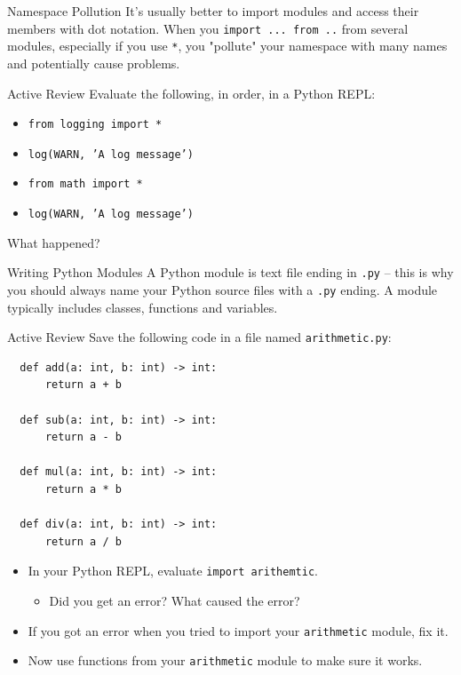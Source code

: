 \documentclass[smaller, aspectratio=1610]{beamer}
\begin{document}
\begin{frame}[label={sec:orgd4aeca5},fragile]{Namespace Pollution}
 It's usually better to import modules and access their members with dot notation.  When you \texttt{import ... from ..} from several modules, especially if you use \texttt{*}, you "pollute" your namespace with many names and potentially cause problems.

\begin{block}{Active Review}
Evaluate the following, in order, in a Python REPL:

\begin{itemize}
\item \texttt{from logging import *}
\item \texttt{log(WARN, 'A log message')}
\item \texttt{from math import *}
\item \texttt{log(WARN, 'A log message')}
\end{itemize}

What happened?
\end{block}
\end{frame}

\begin{frame}[label={sec:org699ffa0},fragile]{Writing Python Modules}
 A Python module is text file ending in \texttt{.py} -- this is why you should always name your Python source files with a \texttt{.py} ending.  A module typically includes classes, functions and variables.

\begin{block}{Active Review}
Save the following code in a file named \texttt{arithmetic.py}:

\lstset{language=Python,label= ,caption= ,captionpos=b,numbers=none}
\begin{lstlisting}
  def add(a: int, b: int) -> int:
      return a + b

  def sub(a: int, b: int) -> int:
      return a - b

  def mul(a: int, b: int) -> int:
      return a * b

  def div(a: int, b: int) -> int:
      return a / b
\end{lstlisting}

\begin{itemize}
\item In your Python REPL, evaluate \texttt{import arithemtic}.
\begin{itemize}
\item Did you get an error?  What caused the error?
\end{itemize}
\item If you got an error when you tried to import your \texttt{arithmetic} module, fix it.
\item Now use functions from your \texttt{arithmetic} module to make sure it works.
\end{itemize}
\end{block}
\end{frame}
\end{document}
